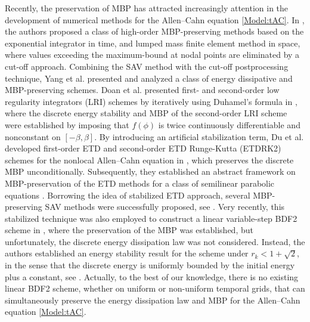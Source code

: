\documentclass{m2an}
\begin{document}
Recently, the preservation of MBP has attracted increasingly attention in the development of numerical methods for the Allen–Cahn equation \eqref{Model:tAC}. In \cite{SISC_2020_LiBuyang}, the authors proposed a class of high-order MBP-preserving methods based on the exponential integrator in time, and lumped mass finite element method in space, where values exceeding the maximum-bound at nodal points are eliminated by a cut-off approach. Combining the SAV method with the cut-off postprocessing technique, Yang et al. \cite{JSC_2022_Yang} presented and analyzed a class of energy dissipative and MBP-preserving schemes. Doan et al. presented first- and second-order low regularity integrators (LRI) schemes by iteratively using Duhamel’s formula in \cite{BIT_2023_Schratz}, where the discrete energy stability and MBP of the second-order LRI scheme were established by imposing that $ f(\phi) $ is twice continuously differentiable and nonconstant on $ [-\beta, \beta] $.
By introducing an artificial stabilization term, Du et al. developed first-order ETD and second-order ETD Runge-Kutta (ETDRK2) schemes for the nonlocal Allen--Cahn equation in \cite{SINUM_Du_2019}, which preserves the discrete MBP unconditionally. Subsequently, they established an abstract framework on MBP-preservation of the ETD methods for a class of semilinear parabolic equations \cite{SIREV_Du_2021}. Borrowing the idea of stabilized  ETD approach, several MBP-preserving SAV methods were successfully proposed, see \cite{SINUM_Ju_2022,JSC_Ju_2022}. Very recently, this stabilized technique was also employed to construct a linear variable-step BDF2 scheme in \cite{MOC_2023_Ju}, where the preservation of the MBP was established, but unfortunately, the discrete energy dissipation law was not considered. Instead, the authors established an energy stability result for the scheme under $ r_{k} < 1 + \sqrt{2} $, in the sense that the discrete energy is uniformly bounded by the initial energy plus a constant, see \cite[Theorem 4.2 \& Remark 4.2]{MOC_2023_Ju}. Actually, to the best of our knowledge, there is no existing linear BDF2 scheme, whether on uniform or non-uniform temporal grids, that can simultaneously preserve the energy dissipation law and MBP for the Allen--Cahn equation \eqref{Model:tAC}.  
\end{document}
